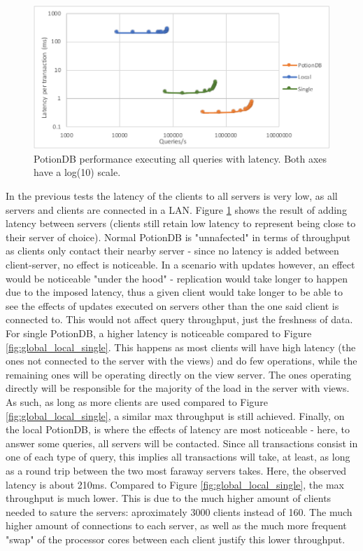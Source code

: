 \documentclass{vldb}
\begin{document}
\begin{figure}
	\centering
	\includegraphics[width=.95\linewidth]{clientScale_tc_cut}
	\caption{PotionDB performance executing all queries with latency. Both axes have a log(10) scale.}
	\label{fig:global_local_single_tc}
\end{figure}

In the previous tests the latency of the clients to all servers is very low, as all servers and clients are connected in a LAN.
Figure \ref{fig:global_local_single_tc} shows the result of adding latency between servers (clients still retain low latency to represent being close to their server of choice).
Normal PotionDB is "unnafected" in terms of throughput as clients only contact their nearby server - since no latency is added between client-server, no effect is noticeable.
In a scenario with updates however, an effect would be noticeable "under the hood" - replication would take longer to happen due to the imposed latency, thus a given client would take longer to be able to see the effects of updates executed on servers other than the one said client is connected to.
This would not affect query throughput, just the freshness of data.
For single PotionDB, a higher latency is noticeable compared to Figure \ref{fig:global_local_single}.
This happens as most clients will have high latency (the ones not connected to the server with the views) and do few operations, while the remaining ones will be operating directly on the view server.
The ones operating directly will be responsible for the majority of the load in the server with views.
As such, as long as more clients are used compared to Figure \ref{fig:global_local_single}, a similar max throughput is still achieved.
Finally, on the local PotionDB, is where the effects of latency are most noticeable - here, to answer some queries, all servers will be contacted. Since all transactions consist in one of each type of query, this implies all transactions will take, at least, as long as a round trip between the two most faraway servers takes.
Here, the observed latency is about 210ms.
Compared to Figure \ref{fig:global_local_single}, the max throughput is much lower. This is due to the much higher amount of clients needed to sature the servers: aproximately 3000 clients instead of 160.
The much higher amount of connections to each server, as well as the much more frequent "swap" of the processor cores between each client justify this lower throughput.
\end{document}
